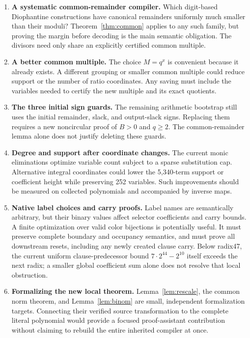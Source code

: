 \documentclass[11pt,letterpaper]{article}
\theoremstyle{remark}\newtheorem{remark}[theorem]{Remark}
\begin{document}
\begin{enumerate}
\item \textbf{A systematic common-remainder compiler.} Which digit-based
      Diophantine constructions have canonical remainders uniformly much
      smaller than their moduli? Theorem~\ref{thm:common} applies to any
      such family, but proving the margin before decoding is the main
      semantic obligation. The divisors need only share an explicitly
      certified common multiple.
\item \textbf{A better common multiple.} The choice $M=q^x$ is convenient
      because it already exists. A different grouping or smaller common
      multiple could reduce support or the number of ratio coordinates.
      Any saving must include the variables needed to certify the new
      multiple and its exact quotients.
\item \textbf{The three initial sign guards.} The remaining arithmetic
      bootstrap still uses the initial remainder, slack, and output-slack
      signs. Replacing them requires a new noncircular proof of $B>0$
      and $q\ge2$. The common-remainder lemma alone does not justify
      deleting these guards.
\item \textbf{Degree and support after coordinate changes.} The current
      monic eliminations optimize variable count subject to a sparse
      substitution cap. Alternative integral coordinates could lower the
      5,340-term support or coefficient height while preserving 252
      variables. Such improvements should be measured on collected
      polynomials and accompanied by inverse maps.
\item \textbf{Native label choices and carry proofs.} Label names are
      semantically arbitrary, but their binary values affect selector
      coefficients and carry bounds. A finite optimization over valid
      color bijections is potentially useful. It must preserve complete
      boundary and occupancy semantics, and must prove all downstream
      resets, including any newly created clause carry. Below radix47, the
      current uniform clause-predecessor bound $7\cdot2^{44}-2^{10}$
      itself exceeds the next radix; a smaller global coefficient sum
      alone does not resolve that local obstruction.
\item \textbf{Formalizing the new local theorem.} Lemma~\ref{lem:rescale},
      the common norm theorem, and Lemma~\ref{lem:binom} are small,
      independent formalization targets. Connecting their verified source
      transformation to the complete literal polynomial would provide a
      focused proof-assistant contribution without claiming to rebuild
      the entire inherited compiler at once.
\end{enumerate}
\end{document}
